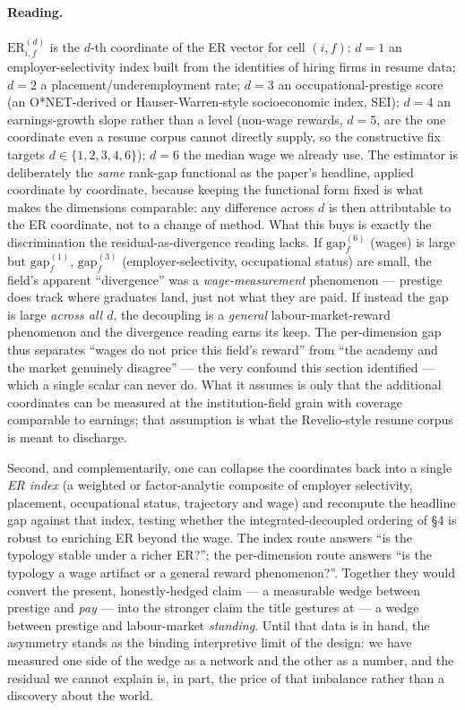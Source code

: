 \documentclass[11pt]{article}
\begin{document}
\paragraph{Reading.} $\mathrm{ER}^{(d)}_{i,f}$ is the $d$-th coordinate of the ER vector for cell $(i,f)$: $d{=}1$ an employer-selectivity index built from the identities of hiring firms in resume data; $d{=}2$ a placement/underemployment rate; $d{=}3$ an occupational-prestige score (an O*NET-derived or Hauser-Warren-style socioeconomic index, SEI); $d{=}4$ an earnings-growth slope rather than a level (non-wage rewards, $d{=}5$, are the one coordinate even a resume corpus cannot directly supply, so the constructive fix targets $d\in\{1,2,3,4,6\}$); $d{=}6$ the median wage we already use. The estimator is deliberately the \emph{same} rank-gap functional as the paper's headline, applied coordinate by coordinate, because keeping the functional form fixed is what makes the dimensions comparable: any difference across $d$ is then attributable to the ER coordinate, not to a change of method. What this buys is exactly the discrimination the residual-as-divergence reading lacks. If $\mathrm{gap}^{(6)}_f$ (wages) is large but $\mathrm{gap}^{(1)}_f$, $\mathrm{gap}^{(3)}_f$ (employer-selectivity, occupational status) are small, the field's apparent ``divergence'' was a \emph{wage-measurement} phenomenon --- prestige does track where graduates land, just not what they are paid. If instead the gap is large \emph{across all $d$}, the decoupling is a \emph{general} labour-market-reward phenomenon and the divergence reading earns its keep. The per-dimension gap thus separates ``wages do not price this field's reward'' from ``the academy and the market genuinely disagree'' --- the very confound this section identified --- which a single scalar can never do. What it assumes is only that the additional coordinates can be measured at the institution-field grain with coverage comparable to earnings; that assumption is what the Revelio-style resume corpus is meant to discharge.

Second, and complementarily, one can collapse the coordinates back into a single \emph{ER index} (a weighted or factor-analytic composite of employer selectivity, placement, occupational status, trajectory and wage) and recompute the headline gap against that index, testing whether the integrated-decoupled ordering of \S4 is robust to enriching ER beyond the wage. The index route answers ``is the typology stable under a richer ER?''; the per-dimension route answers ``is the typology a wage artifact or a general reward phenomenon?''. Together they would convert the present, honestly-hedged claim --- a measurable wedge between prestige and \emph{pay} --- into the stronger claim the title gestures at --- a wedge between prestige and labour-market \emph{standing}. Until that data is in hand, the asymmetry stands as the binding interpretive limit of the design: we have measured one side of the wedge as a network and the other as a number, and the residual we cannot explain is, in part, the price of that imbalance rather than a discovery about the world.%
\end{document}
